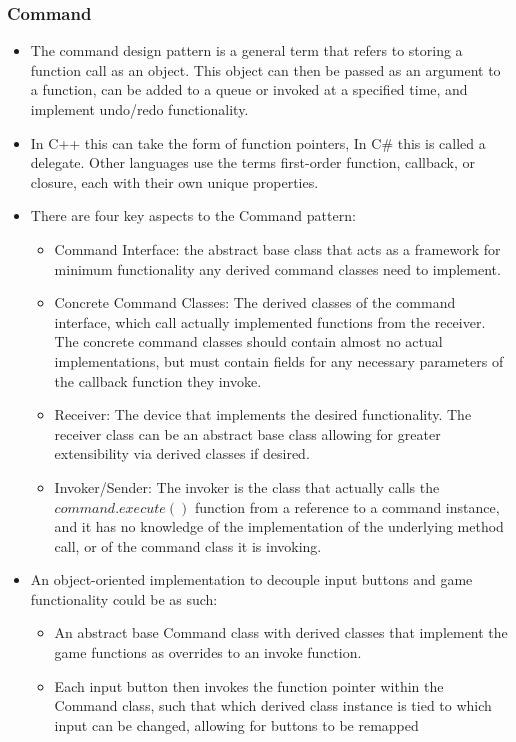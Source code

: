 \documentclass{article}
\begin{document}
\subsubsection{Command}
\begin{itemize}
    \item The command design pattern is a general term that refers to storing a function call as an object. This object can then be passed as an argument to a function, can be added to a queue or invoked at a specified time, and implement undo/redo functionality.
    \item In C++ this can take the form of function pointers, In C\# this is called a delegate. Other languages use the terms first-order function, callback, or closure, each with their own unique properties.
    \item There are four key aspects to the Command pattern:
    \begin{itemize}
        \item Command Interface: the abstract base class that acts as a framework for minimum functionality any derived command classes need to implement.
        \item Concrete Command Classes: The derived classes of the command interface, which call actually implemented functions from the receiver. The concrete command classes should contain almost no actual implementations, but must contain fields for any necessary parameters of the callback function they invoke.
        \item Receiver: The device that implements the desired functionality. The receiver class can be an abstract base class allowing for greater extensibility via derived classes if desired.
        \item Invoker/Sender: The invoker is the class that actually calls the $command.execute()$ function from a reference to a command instance, and it has no knowledge of the implementation of the underlying method call, or of the command class it is invoking.
    \end{itemize}
    \item An object-oriented implementation to decouple input buttons and game functionality could be as such:
    \begin{itemize}
        \item An abstract base Command class with derived classes that implement the game functions as overrides to an invoke function. 
        \item Each input button then invokes the function pointer within the Command class, such that which derived class instance is tied to which input can be changed, allowing for buttons to be remapped

\end{itemize}
\end{itemize}
\end{document}
